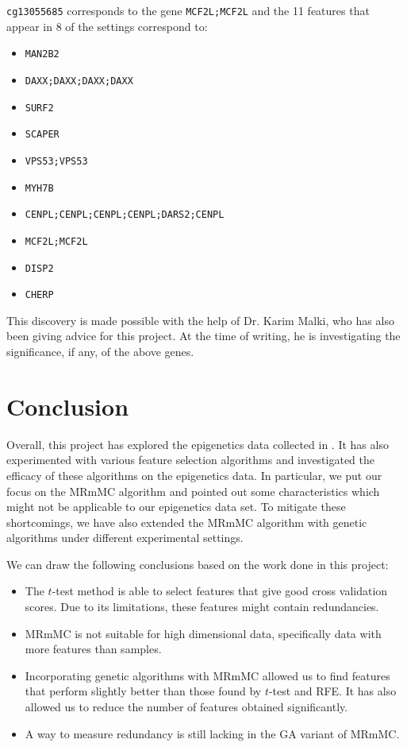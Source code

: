 \documentclass[12pt, twoside, a4paper]{report}
\begin{document}
\texttt{cg13055685} corresponds to the gene \texttt{MCF2L;MCF2L} and the 11 features that appear in 8 of the settings correspond to:
\begin{itemize}
  \item \texttt{MAN2B2}
  \item \texttt{DAXX;DAXX;DAXX;DAXX}
  \item \texttt{SURF2}
  \item \texttt{SCAPER}
  \item \texttt{VPS53;VPS53}
  \item \texttt{MYH7B}
  \item \texttt{CENPL;CENPL;CENPL;CENPL;DARS2;CENPL}
  \item \texttt{MCF2L;MCF2L}
  \item \texttt{DISP2}
  \item \texttt{CHERP}
\end{itemize}

This discovery is made possible with the help of Dr. Karim Malki, who has also been giving advice for this project. At the time of writing, he is investigating the significance, if any, of the above genes.


\chapter{Conclusion}

Overall, this project has explored the epigenetics data collected in \cite{RefWorks:78}. It has also experimented with various feature selection algorithms and investigated the efficacy of these algorithms on the epigenetics data. In particular, we put our focus on the MRmMC algorithm and pointed out some characteristics which might not be applicable to our epigenetics data set. To mitigate these shortcomings, we have also extended the MRmMC algorithm with genetic algorithms under different experimental settings.

We can draw the following conclusions based on the work done in this project:
\begin{itemize}
  \item The $t$-test method is able to select features that give good cross validation scores. Due to its limitations, these features might contain redundancies.
  \item MRmMC is not suitable for high dimensional data, specifically data with more features than samples.
  \item Incorporating genetic algorithms with MRmMC allowed us to find features that perform slightly better than those found by $t$-test and RFE. It has also allowed us to reduce the number of features obtained significantly.
  \item A way to measure redundancy is still lacking in the GA variant of MRmMC.
\end{itemize}
\end{document}

